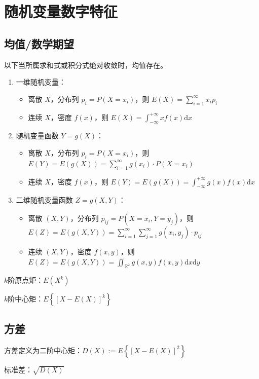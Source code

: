 \documentclass[UTF8]{ctexart}
\newcommand\Concept[1]{\textcolor{cyan!70!black}{#1}}
\renewcommand\d{\mathrm{d}}
\begin{document}
\section{随机变量数字特征}
\subsection{均值/数学期望}
以下当所属求和式或积分式绝对收敛时，\Concept{均值}存在。
\begin{enumerate}
  \item 一维随机变量：
  \begin{itemize}
    \item 离散 $X$，分布列 $p_i=P(X=x_i)$，则 $\displaystyle E(X) = \sum\limits_{i=1}^{\infty} x_ip_i$
    \item 连续 $X$，密度 $f(x)$，则 $\displaystyle E(X) = \int_{-\infty}^{+\infty}  xf(x)\d x$
  \end{itemize}
  \item 随机变量函数 $Y=g(X)$：
  \begin{itemize}
    \item 离散 $X$，分布列 $p_i=P(X=x_i)$，则 $\displaystyle E(Y) = E(g(X)) = \sum\limits_{i=1}^{\infty} g(x_i) \cdot P(X=x_i)$
    \item 连续 $X$，密度 $f(x)$，则 $\displaystyle E(Y) = E(g(X)) = \int_{-\infty}^{+\infty}  g(x) f(x)\d x$
  \end{itemize}
  \item 二维随机变量函数 $Z=g(X,Y)$：
  \begin{itemize}
    \item 离散 $(X,Y)$，分布列 $p_{ij}=P(X=x_i,Y=y_j)$，则 $\displaystyle E(Z) = E(g(X,Y)) = \sum\limits_{i=1}^\infty \sum\limits_{j=1}^\infty  g(x_i,y_j)\cdot p_{ij}$
    \item 连续 $(X,Y)$，密度 $f(x,y)$，则 $\displaystyle E(Z) = E(g(X,Y)) = \iint_{\mathbb{R}^2} g(x,y)f(x,y)\d x\d y$
  \end{itemize}
\end{enumerate}

$k$阶原点矩：$E(X^k)$

$k$阶中心矩：$E\left\{[X-E(X)]^k\right\}$

\subsection{方差}
\Concept{方差}定义为二阶中心矩：$D(X) := E\left\{[X-E(X)]^2\right\}$

\Concept{标准差}：$\sqrt{D(X)}$
\end{document}
